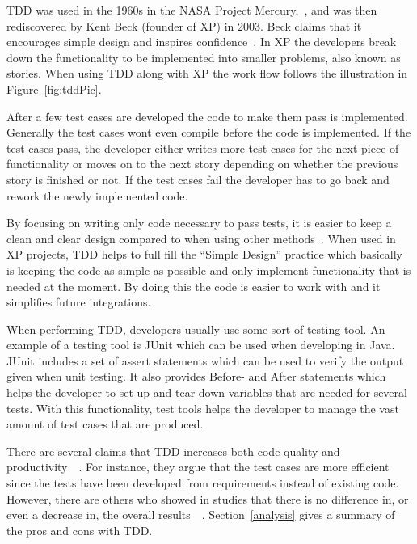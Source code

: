 
TDD was used in the 1960s in the NASA Project Mercury,~\cite{NASA}, and was then rediscovered by Kent Beck (founder of XP) in 2003. Beck claims that it encourages simple design and inspires confidence~\cite{beckXP}. In XP the developers break down the functionality to be implemented into smaller problems, also known as stories. When using TDD along with XP the work flow follows the illustration in Figure~\ref{fig:tddPic}.

After a few test cases are developed the code to make them pass is implemented. Generally the test cases wont even compile before the code is implemented. If the test cases pass, the developer either writes more test cases for the next piece of functionality or moves on to the next story depending on whether the previous story is finished or not. If the test cases fail the developer has to go back and rework the newly implemented code.


By focusing on writing only code necessary to pass tests, it is easier to keep a clean and clear design compared to when using other methods~\cite{beckXP}. When used in XP projects, TDD helps to full fill the ``Simple Design'' practice which basically is keeping the code as simple as possible and only implement functionality that is needed at the moment. By doing this the code is easier to work with and it simplifies future integrations. 

When performing TDD, developers usually use some sort of testing tool. An example of a testing tool is JUnit which can be used when developing in Java. JUnit includes a set of assert statements which can be used to verify the output given when unit testing. It also provides Before- and After statements which helps the developer to set up and tear down variables that are needed for several tests. With this functionality, test tools helps the developer to manage the vast amount of test cases that are produced.

There are several claims that TDD increases both code quality and productivity~\cite{beckXP}~\cite{erdogmus}. For instance, they argue that the test cases are more efficient since the tests have been developed from requirements instead of existing code. However, there are others who showed in studies that there is no difference in, or even a decrease in, the overall results~\cite{tddInvest}~\cite{mullerandhagner}. Section~\ref{analysis} gives a summary of the pros and cons with TDD.